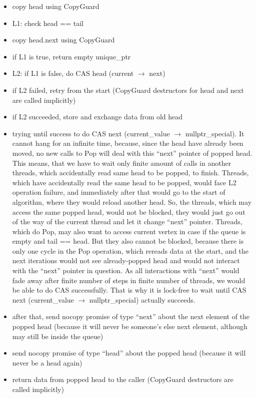 \documentclass{article}
\begin{document}
\begin{itemize}
	\item copy head using CopyGuard
	\item L1: check head == tail
	\item copy head.next using CopyGuard
	\item if L1 is true, return empty unique\_ptr
	\item L2: if L1 is false, do CAS head (current $\rightarrow$ next)
	\item if L2 failed, retry from the start (CopyGuard destructors for head and next are called implicitly)
	\item if L2 succeeded, store and exchange data from old head
	\item trying until success to do CAS next (current\_value $\rightarrow$ nullptr\_special). It cannot hang for an infinite time, because, since the head have already been moved, no new calls to Pop will deal with this ``next'' pointer of popped head. This means, that we have to wait only finite amount of calls in another threads, which accidentally read same head to be popped, to finish. Threads, which have accidentally read the same head to be popped, would face L2 operation failure, and immediately after that would go to the start of algorithm, where they would reload another head. So, the threads, which may access the same popped head, would not be blocked, they would just go out of the way of the current thread and let it change ``next'' pointer. Threads, which do Pop, may also want to access current vertex in case if the queue is empty and tail == head. But they also cannot be blocked, because there is only one cycle in the Pop operation, which rereads data at the start, and the next iterations would not see already-popped head and would not interact with the ``next'' pointer in question. As all interactions with ``next'' would fade away after finite number of steps in finite number of threads, we would be able to do CAS successfully. That is why it is lock-free to wait until CAS next (current\_value $\rightarrow$ nullptr\_special) actually succeeds.
	\item after that, send nocopy promise of type ``next'' about the next element of the popped head (because it will never be someone's else next element, although may still be inside the queue)
	\item send nocopy promise of type ``head'' about the popped head (because it will never be a head again)
	\item return data from popped head to the caller (CopyGuard destructors are called implicitly)
\end{itemize}
\end{document}
